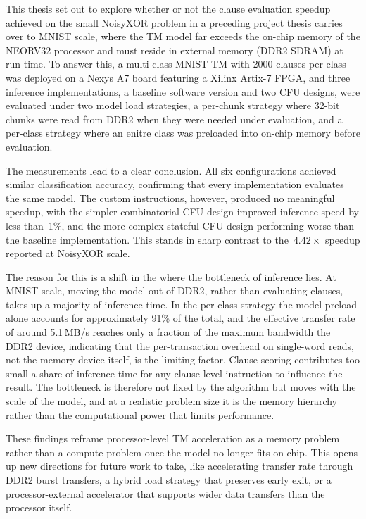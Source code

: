 This thesis set out to explore whether or not the clause evaluation speedup achieved on the small NoisyXOR problem in a preceding project thesis \cite{JB2025} carries over to MNIST scale, where the TM model far exceeds the on-chip memory of the NEORV32 processor and must reside in external memory (DDR2 SDRAM) at run time. To answer this, a multi-class MNIST TM with 2000 clauses per class was deployed on a Nexys A7 board featuring a Xilinx Artix-7 FPGA, and three inference implementations, a baseline software version and two CFU designs, were evaluated under two model load strategies, a per-chunk strategy where 32-bit chunks were read from DDR2 when they were needed under evaluation, and a per-class strategy where an enitre class was preloaded into on-chip memory before evaluation.


The measurements lead to a clear conclusion. All six configurations achieved similar classification accuracy, confirming that every implementation evaluates the same model. The custom instructions, however, produced no meaningful speedup, with the simpler combinatorial CFU design improved inference speed by less than~1\%, and the more complex stateful CFU design performing worse than the baseline implementation. This stands in sharp contrast to the~$4.42\times$ speedup reported at NoisyXOR scale.

The reason for this is a shift in the where the bottleneck of inference lies. At MNIST scale, moving the model out of DDR2, rather than evaluating clauses, takes up a majority of inference time.  In the per-class strategy the model preload alone accounts for approximately 91\% of the total, and the effective transfer rate of around 5.1\,MB/s reaches only a fraction of the maximum bandwidth the DDR2 device, indicating that the per-transaction overhead on single-word reads, not the memory device itself, is the limiting factor. Clause scoring contributes too small a share of inference time for any clause-level instruction to influence the result. The bottleneck is therefore not fixed by the algorithm but moves with the scale of the model, and at a realistic problem size it is the memory hierarchy rather than the computational power that limits performance.

These findings reframe processor-level TM acceleration as a memory problem rather than a compute problem once the model no longer fits on-chip. This opens up new directions for future work to take, like accelerating transfer rate through DDR2 burst transfers, a hybrid load strategy that preserves early exit,  or a processor-external accelerator that supports wider data transfers than the processor itself. 


